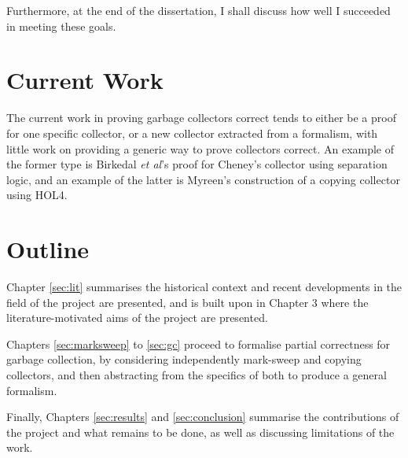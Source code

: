 Furthermore, at the end of the dissertation, I shall discuss how well
I succeeded in meeting these goals.

\section{Current Work}
\label{sec:intro-current}

The current work in proving garbage collectors correct tends to either
be a proof for one specific collector, or a new collector extracted
from a formalism, with little work on providing a generic way to prove
collectors correct. An example of the former type is Birkedal
\textit{et al}'s\cite{Birkedal04} proof for Cheney's collector using
separation logic, and an example of the latter is
Myreen's\cite{Myreen10} construction of a copying collector using
HOL4.

\section{Outline}
\label{sec:intro-outline}

Chapter \ref{sec:lit} summarises the historical context and recent
developments in the field of the project are presented, and is built
upon in Chapter 3 where the literature-motivated aims of the project
are presented.

Chapters \ref{sec:marksweep} to \ref{sec:gc} proceed to formalise
partial correctness for garbage collection, by considering
independently mark-sweep and copying collectors, and then abstracting
from the specifics of both to produce a general formalism.

Finally, Chapters \ref{sec:results} and \ref{sec:conclusion} summarise
the contributions of the project and what remains to be done, as well
as discussing limitations of the work.
